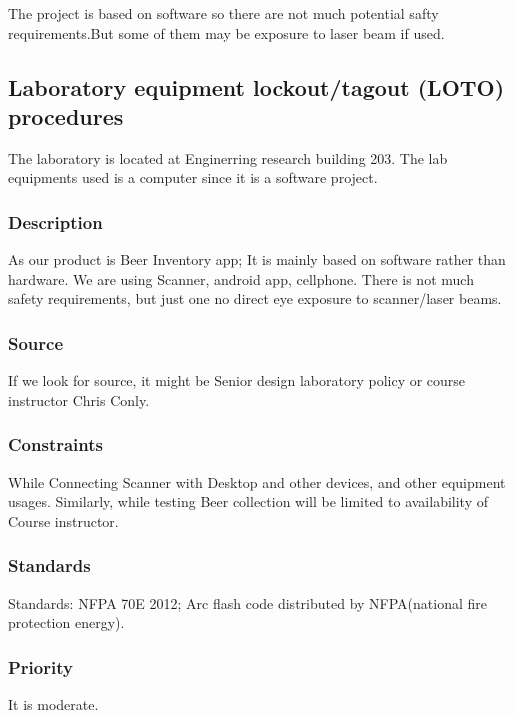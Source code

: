 The project is based on software so there are not much potential safty requirements.But some of them may be  exposure to laser beam if used.
\subsection{Laboratory equipment lockout/tagout (LOTO) procedures}
The laboratory is located at Enginerring research building 203. The lab equipments used is a computer since it is a software project.
\subsubsection{Description}
 As our product is Beer Inventory app; It is mainly based on software rather than hardware. We are using Scanner, android app, cellphone. There is not much safety requirements, but just one no direct eye exposure to scanner/laser beams. 
\subsubsection{Source}
If we look for source, it might be Senior design laboratory policy or course instructor Chris Conly. 
\subsubsection{Constraints}
While Connecting Scanner with Desktop and other devices, and other equipment usages. Similarly, while testing Beer collection will be limited to availability of Course instructor.
\subsubsection{Standards}
Standards: NFPA 70E 2012; Arc flash code distributed by NFPA(national fire protection energy).
\subsubsection{Priority}
It is moderate.

